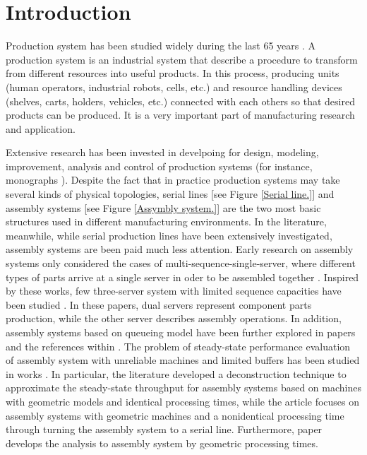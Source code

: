 \chapter{Introduction}
\setlength{\parindent}{2pc}
\label{intro}
\noindent 
Production system has been studied widely during the last 65 years \cite{papadopolous1993queueing}. A production system is an industrial system that describe a procedure to transform from different resources into useful products. In this process, producing units (human operators, industrial robots, cells, etc.) and resource handling devices (shelves, carts, holders, vehicles, etc.) connected with each others so that desired products can be produced. It is a very important part of manufacturing research and application. 

Extensive research has been invested in develpoing for design, modeling, improvement, analysis and control of production systems (for instance, monographs \cite{buzacott1993stochastic, askin1993modeling, bonomi1987approximate, rao2000performance}). Despite the fact that in practice production systems may take several kinds of physical topologies, serial lines [see Figure \ref{Serial line.}] and assembly systems [see Figure \ref{Assymbly system.}] are the two most basic structures used in different manufacturing environments. In the literature, meanwhile, while serial production lines have been extensively investigated, assembly systems are been paid much less attention. Early research on assembly systems only considered the cases of multi-sequence-single-server, where different types of parts arrive at a single server in oder to be assembled together \cite{harrison1973assembly, bonomi1987approximate}. Inspired by these works, few three-server system with limited sequence capacities have been studied \cite{kuo1996improvability,lipper1986assembly}. In these papers, dual servers represent component parts production, while the other server describes assembly operations. In addition, assembly systems based on queueing model have been further explored in papers \cite{manitz2008queueing, rao2000performance, rao1994approximate} and the references within . The problem of steady-state performance evaluation of assembly system with unreliable machines and limited buffers has been studied in works \cite{gershwin1991assembly,liu1990approximate, helber1998decomposition, mascolo1991modeling, chiang2000improvability, chiang1970improvability} . In particular, the literature \cite{gershwin1991assembly} developed a deconstruction technique to approximate the steady-state throughput for assembly systems based on machines with geometric models and identical processing times, while the article \cite{liu1990approximate} focuses on assembly systems with geometric machines and a nonidentical processing time through turning the assembly system to a serial line. Furthermore, paper \cite{helber1998decomposition} develops the analysis to assembly system by geometric processing times.

